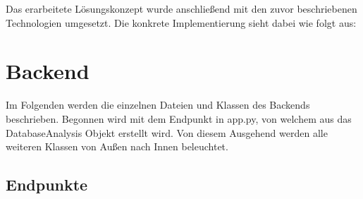 Das erarbeitete Lösungskonzept wurde anschließend mit den zuvor beschriebenen Technologien umgesetzt.
Die konkrete Implementierung sieht dabei wie folgt aus:

\section{Backend}
\label{sec:backend}

Im Folgenden werden die einzelnen Dateien und Klassen des Backends beschrieben.
Begonnen wird mit dem Endpunkt in app.py, von welchem aus das DatabaseAnalysis Objekt erstellt wird.
Von diesem Ausgehend werden alle weiteren Klassen von Außen nach Innen beleuchtet.

\subsection{Endpunkte}
\label{sub:ba_endpunkte}

